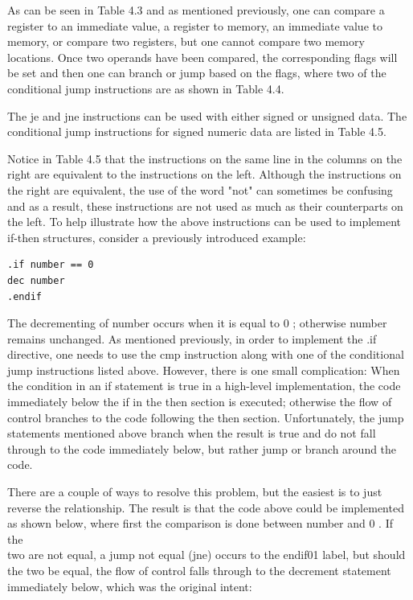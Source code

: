 \documentclass[10pt]{book}
\begin{document}
As can be seen in Table 4.3 and as mentioned previously, one can compare a register to an immediate value, a register to memory, an immediate value to memory, or compare two registers, but one cannot compare two memory locations. Once two operands have been compared, the corresponding flags will be set and then one can branch or jump based on the flags, where two of the conditional jump instructions are as shown in Table 4.4.


The je and jne instructions can be used with either signed or unsigned data. The conditional jump instructions for signed numeric data are listed in Table 4.5.

Notice in Table 4.5 that the instructions on the same line in the columns on the right are equivalent to the instructions on the left. Although the instructions on the right are equivalent, the use of the word "not" can sometimes be confusing and as a result, these instructions are not used as much as their counterparts on the left. To help illustrate how the above instructions can be used to implement if-then structures, consider a previously introduced example:

\begin{verbatim}
.if number == 0
dec number
.endif
\end{verbatim}

The decrementing of number occurs when it is equal to 0 ; otherwise number remains unchanged. As mentioned previously, in order to implement the .if directive, one needs to use the cmp instruction along with one of the conditional jump instructions listed above. However, there is one small complication: When the condition in an if statement is true in a high-level implementation, the code immediately below the if in the then section is executed; otherwise the flow of control branches to the code following the then section. Unfortunately, the jump statements mentioned above branch when the result is true and do not fall through to the code immediately below, but rather jump or branch around the code.

There are a couple of ways to resolve this problem, but the easiest is to just reverse the relationship. The result is that the code above could be implemented as shown below, where first the comparison is done between number and 0 . If the\\
two are not equal, a jump not equal (jne) occurs to the endif01 label, but should the two be equal, the flow of control falls through to the decrement statement immediately below, which was the original intent:
\end{document}
